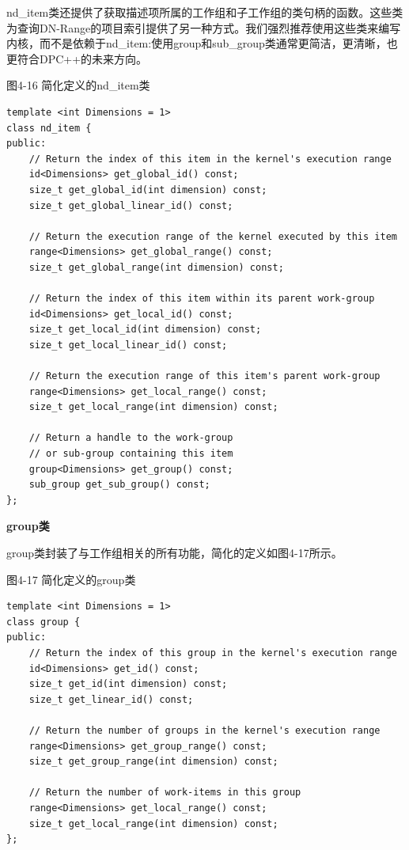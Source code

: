 nd\_item类还提供了获取描述项所属的工作组和子工作组的类句柄的函数。这些类为查询DN-Range的项目索引提供了另一种方式。我们强烈推荐使用这些类来编写内核，而不是依赖于nd\_item:使用group和sub\_group类通常更简洁，更清晰，也更符合DPC++的未来方向。\par

\hspace*{\fill} \par %
图4-16 简化定义的nd\_item类
\begin{lstlisting}[caption={}]
template <int Dimensions = 1>
class nd_item {
public:
	// Return the index of this item in the kernel's execution range
	id<Dimensions> get_global_id() const;
	size_t get_global_id(int dimension) const;
	size_t get_global_linear_id() const;
	
	// Return the execution range of the kernel executed by this item
	range<Dimensions> get_global_range() const;
	size_t get_global_range(int dimension) const;
	
	// Return the index of this item within its parent work-group
	id<Dimensions> get_local_id() const;
	size_t get_local_id(int dimension) const;
	size_t get_local_linear_id() const;
	
	// Return the execution range of this item's parent work-group
	range<Dimensions> get_local_range() const;
	size_t get_local_range(int dimension) const;
	
	// Return a handle to the work-group
	// or sub-group containing this item
	group<Dimensions> get_group() const;
	sub_group get_sub_group() const;
};
\end{lstlisting}

\hspace*{\fill} \par %
\textbf{group类}

group类封装了与工作组相关的所有功能，简化的定义如图4-17所示。\par

\hspace*{\fill} \par %
图4-17 简化定义的group类
\begin{lstlisting}[caption={}]
template <int Dimensions = 1>
class group {
public:
	// Return the index of this group in the kernel's execution range
	id<Dimensions> get_id() const;
	size_t get_id(int dimension) const;
	size_t get_linear_id() const;
	
	// Return the number of groups in the kernel's execution range
	range<Dimensions> get_group_range() const;
	size_t get_group_range(int dimension) const;
	
	// Return the number of work-items in this group
	range<Dimensions> get_local_range() const;
	size_t get_local_range(int dimension) const;
};
\end{lstlisting}

